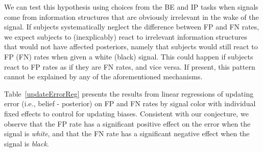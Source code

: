 \documentclass[12pt,a4paper]{article}
\begin{document}
We can test this hypothesis using choices from the BE and IP tasks when signals come from information structures that are obviously irrelevant in the wake of the signal. If subjects systematically neglect the difference between FP and FN rates, we expect subjects to (inexplicably) react to irrelevant information structures that would not have affected posteriors, namely that subjects would still react to FP (FN) rates when given a white (black) signal. This could happen if subjects react to FP rates as if they are FN rates, and vice versa. If present, this pattern cannot be explained by any of the aforementioned mechanisms.  



\begin{table}[htbp]\centering 
\caption{Updating Errors in BE Task} 
\label{updateErrorReg}
\end{table}



Table~\ref{updateErrorReg} presents the results from linear regressions of updating error (i.e., belief - posterior) on FP and FN rates by signal color with individual fixed effects to control for updating biases. Consistent with our conjecture, we observe that the FP rate has a significant positive effect on the error when the signal is \textit{white}, and that the FN rate has a significant negative effect when the signal is \textit{black}. 
\end{document}
